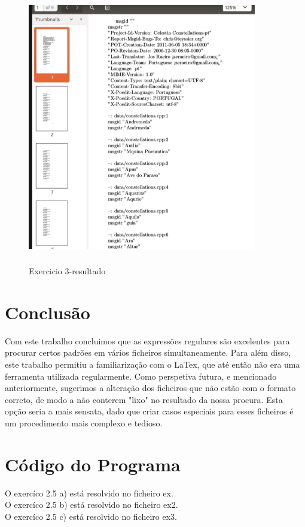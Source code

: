 \documentclass{report}
\begin{document}
\begin{figure}[h]
\centering
\includegraphics[width=10cm,height= 12cm]{exercicio32.png}
\caption{Exercicio 3-resultado}
\label{Exercicio 3}
\end{figure}


\chapter{Conclusão} \label{concl}
Com este trabalho concluimos que as expressões regulares são excelentes para procurar certos padrões em vários ficheiros simultaneamente.
Para além disso, este trabalho permitiu a familiarização com o LaTex, que até então não era uma ferramenta utilizada regularmente.
Como perspetiva futura, e mencionado anteriormente, sugerimos a alteração dos ficheiros que não estão com o formato correto, de modo a não conterem "lixo" no resultado da nossa procura. Esta opção seria a mais sensata, dado que criar casos especiais para esses ficheiros é um procedimento mais complexo e tedioso.



\chapter{Código do Programa}

O exercíco 2.5 a) está resolvido no ficheiro ex.\\
O exercíco 2.5 b) está resolvido no ficheiro ex2.\\
O exercíco 2.5 c) está resolvido no ficheiro ex3.\\
\end{document}
